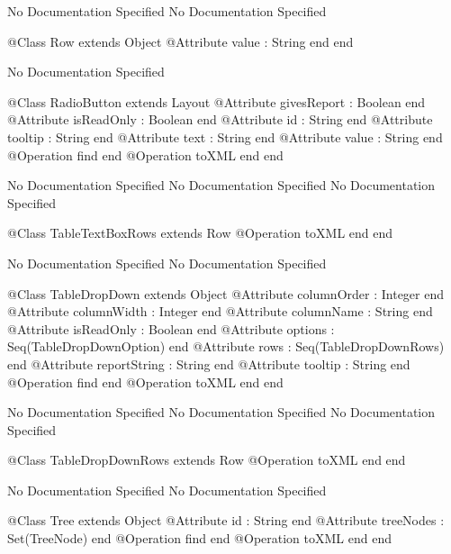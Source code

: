 No Documentation Specified
No Documentation Specified
\begin{Interface}
@Class Row extends Object
  @Attribute value : String end
end
\end{Interface}
No Documentation Specified
\begin{Interface}
@Class RadioButton extends Layout
  @Attribute givesReport : Boolean end
  @Attribute isReadOnly : Boolean end
  @Attribute id : String end
  @Attribute tooltip : String end
  @Attribute text : String end
  @Attribute value : String end
  @Operation find end
  @Operation toXML end
end
\end{Interface}
No Documentation Specified
No Documentation Specified
No Documentation Specified
\begin{Interface}
@Class TableTextBoxRows extends Row
  @Operation toXML end
end
\end{Interface}
No Documentation Specified
No Documentation Specified
\begin{Interface}
@Class TableDropDown extends Object
  @Attribute columnOrder : Integer end
  @Attribute columnWidth : Integer end
  @Attribute columnName : String end
  @Attribute isReadOnly : Boolean end
  @Attribute options : Seq(TableDropDownOption) end
  @Attribute rows : Seq(TableDropDownRows) end
  @Attribute reportString : String end
  @Attribute tooltip : String end
  @Operation find end
  @Operation toXML end
end
\end{Interface}
No Documentation Specified
No Documentation Specified
No Documentation Specified
\begin{Interface}
@Class TableDropDownRows extends Row
  @Operation toXML end
end
\end{Interface}
No Documentation Specified
No Documentation Specified
\begin{Interface}
@Class Tree extends Object
  @Attribute id : String end
  @Attribute treeNodes : Set(TreeNode) end
  @Operation find end
  @Operation toXML end
end
\end{Interface}
